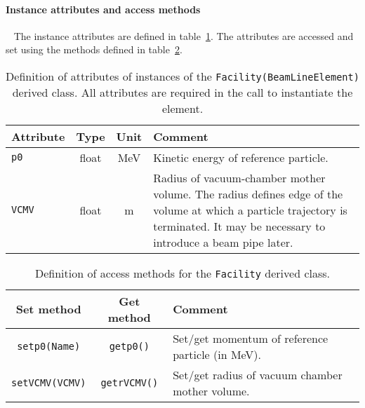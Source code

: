 \paragraph{Instance attributes and access methods} ~\newline
\label{SubSubSect:Fclty:InstAttr}
\noindent
The instance attributes are defined in
table~\ref{Tab:Fclty:Attributes}. 
The attributes are accessed and set using the methods defined in
table~\ref{Tab:Fclty:Methods}.
\begin{table}[h]
  \caption{
    Definition of attributes of instances of
    the \texttt{Facility(BeamLineElement)} derived class.
    All attributes are required in the call to instantiate the
    element.
  }
  \label{Tab:Fclty:Attributes}
  \begin{center}
    \begin{tabular}{|l|c|c|p{10cm}|}
      \hline
      \textbf{Attribute} & \textbf{Type} & \textbf{Unit} & \textbf{Comment}                                                                   \\
      \hline
      \texttt{p0}   & float & MeV & Kinetic energy of reference particle. \\
      \texttt{VCMV} & float & m   & Radius of vacuum-chamber mother
                                    volume.
                                    The radius defines edge of the volume
                                    at which a particle trajectory is
                                    terminated.
                                    It may be necessary to introduce a beam
                                    pipe later.                            \\
      \hline
    \end{tabular}
  \end{center}
\end{table}
\begin{table}[h]
  \caption{
    Definition of access methods for the \texttt{Facility} derived
    class. 
  }
  \label{Tab:Fclty:Methods}
  \begin{center}
    \begin{tabular}{|c|c|p{7cm}|}
      \hline
      \textbf{Set method} & \textbf{Get method}  & \textbf{Comment}                                   \\
      \hline
      \texttt{setp0(Name)}   & \texttt{getp0()}    & Set/get momentum of reference particle (in MeV). \\
      \texttt{setVCMV(VCMV)} & \texttt{getrVCMV()} & Set/get radius of vacuum chamber mother volume.  \\
      \hline
    \end{tabular}
  \end{center}
\end{table}


